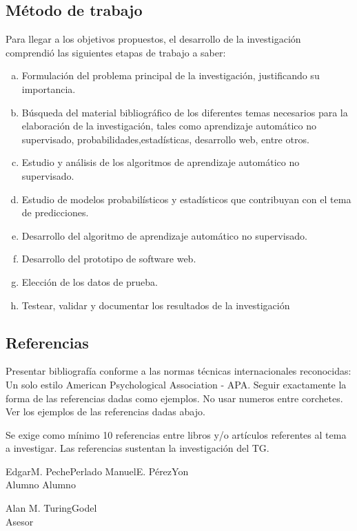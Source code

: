 \documentclass[a4paper, 12pt]{article}
\begin{document}
\subsection{Método de trabajo}


\vskip 0.1cm
Para llegar a los objetivos propuestos, el desarrollo de la investigación comprendió las siguientes etapas de trabajo a saber:
\begin{enumerate} [a)]
\item Formulación del problema principal de la investigación, justificando su importancia.
\item Búsqueda del material bibliográfico de los diferentes temas necesarios para la elaboración de la investigación, tales como aprendizaje automático no supervisado, probabilidades,estadísticas, desarrollo web, entre otros.
\item Estudio y análisis de los algoritmos de aprendizaje automático no supervisado.
\item Estudio de modelos probabilísticos y estadísticos que contribuyan con el tema de predicciones.
\item Desarrollo del algoritmo de aprendizaje automático no supervisado.
\item Desarrollo del prototipo de software web.
\item Elección de los datos de prueba.
\item Testear, validar y documentar los resultados de la investigación
\end{enumerate}
   


\subsection{Referencias}
Presentar bibliografía conforme a las normas técnicas internacionales reconocidas: Un solo estilo American Psychological Association - APA. Seguir exactamente la forma de las referencias dadas como ejemplos. No usar numeros entre corchetes. Ver los ejemplos de las referencias dadas abajo.\par
\vskip 0.3cm
Se exige como mínimo 10 referencias entre libros y/o artículos referentes al tema a investigar. Las referencias sustentan la investigación del TG.



\vskip 1cm

\hspace{0.7cm}Edgar\hspace{.1cm}M.\hspace{.1cm} Peche\hspace{.1cm}Perlado 
\hspace{4cm}Manuel\hspace{.1cm}E.\hspace{.1cm} Pérez\hspace{.1cm}Yon \\
\hspace*{2.6cm} Alumno  \hspace*{6.6cm}Alumno


\vskip 1cm
\begin{center}
Alan \hspace{.1cm}M.\hspace{.1cm} Turing\hspace{.1cm}Godel\\
 Asesor
\end{center}
\end{document}
